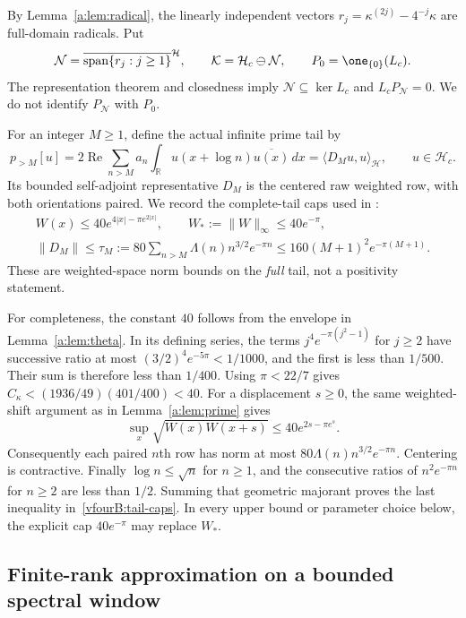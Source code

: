 \documentclass[11pt,a4paper]{article}
\numberwithin{equation}{section}
\theoremstyle{definition}\newtheorem{definition}[theorem]{Definition}
\theoremstyle{remark}\newtheorem{remark}[theorem]{Remark}
\newcommand{\R}{\mathbb R}\newcommand{\C}{\mathbb C}\newcommand{\N}{\mathbb N}
\newcommand{\Hh}{\mathcal H}\newcommand{\Hw}{\mathcal H}
\newcommand{\ip}[2]{\langle#1,#2\rangle}\newcommand{\norm}[1]{\lVert#1\rVert}\newcommand{\abs}[1]{\lvert#1\rvert}
\newcommand{\Nn}{\mathcal N}\newcommand{\Ii}{\mathcal I}\newcommand{\Zz}{\mathcal Z}
\newcommand{\Kk}{\mathcal K}\newcommand{\Aa}{\mathcal A}\newcommand{\Ff}{\mathcal F}
\begin{document}
By Lemma~\ref{a:lem:radical}, the linearly independent vectors
$r_j=\kappa^{(2j)}-4^{-j}\kappa$ are full-domain radicals. Put
\begin{equation}\label{vfourB:known-radical}
 \Nn=\overline{\operatorname{span}\{r_j:j\ge1\}}^{\Hh},
 \qquad \Kk=\Hh_c\ominus\Nn,
 \qquad P_0=\one_{\{0\}}(L_c).
\end{equation}
The representation theorem and closedness imply
$\Nn\subseteq\ker L_c$ and $L_cP_\Nn=0$. We do not identify
$P_\Nn$ with $P_0$.

For an integer $M\ge1$, define the actual infinite prime tail by
\begin{equation}\label{vfourB:tail-form}
 p_{>M}[u]=2\operatorname{Re}\sum_{n>M}
 a_n\int_{\R}u(x+\log n)\overline{u(x)}\,dx
 =\ip{D_Mu}{u}_{\Hh},\qquad u\in\Hh_c.
\end{equation}
Its bounded self-adjoint representative $D_M$ is the centered raw weighted
row, with both orientations paired. We record the complete-tail caps used
in \cite{vfourLowWindow}:
\begin{equation}\label{vfourB:tail-caps}
 \begin{gathered}
 W(x)\le40e^{4|x|-\pi e^{2|x|}},\qquad
 W_*:=\norm W_\infty\le40e^{-\pi},\\
 \norm{D_M}\le\tau_M:=80\sum_{n>M}\Lambda(n)n^{3/2}e^{-\pi n}
 \le160(M+1)^2e^{-\pi(M+1)}.
 \end{gathered}
\end{equation}
These are weighted-space norm bounds on the \emph{full} tail, not a
positivity statement.

For completeness, the constant $40$ follows from the envelope in
Lemma~\ref{a:lem:theta}. In its defining series, the terms
$j^4e^{-\pi(j^2-1)}$ for $j\ge2$ have successive ratio at most
$(3/2)^4e^{-5\pi}<1/1000$, and the first is less than $1/500$.
Their sum is therefore less than $1/400$. Using $\pi<22/7$ gives
$C_\kappa<(1936/49)(401/400)<40$.
For a displacement $s\ge0$, the same weighted-shift argument as in
Lemma~\ref{a:lem:prime} gives
\[
 \sup_x\sqrt{W(x)W(x+s)}\le40e^{2s-\pi e^s}.
\]
Consequently each paired $n$th row has norm at most
$80\Lambda(n)n^{3/2}e^{-\pi n}$. Centering is contractive.
Finally $\log n\le\sqrt n$ for $n\ge1$, and the consecutive ratios of
$n^2e^{-\pi n}$ for $n\ge2$ are less than $1/2$. Summing that geometric
majorant proves the last inequality in~\eqref{vfourB:tail-caps}.
In every upper bound or parameter choice below, the explicit cap
$40e^{-\pi}$ may replace $W_*$.

\subsection{Finite-rank approximation on a bounded spectral window}
\label{vfourB:approximation}
\end{document}
